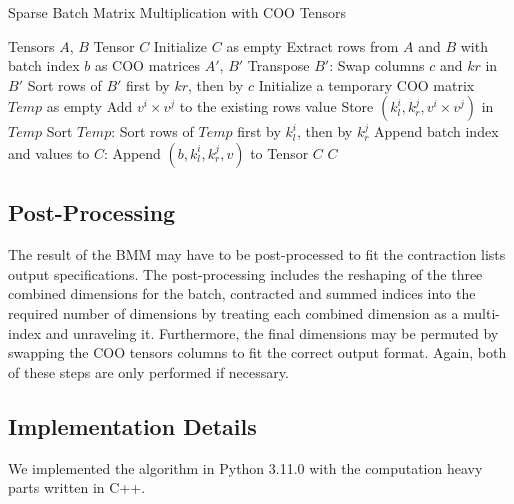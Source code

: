 \begin{algorithm}[H]
    \caption{Sparse Batch Matrix Multiplication with COO Tensors}
    \begin{algorithmic}[1]
        \REQUIRE Tensors $A$, $B$
        \ENSURE Tensor $C$
        \STATE Initialize $C$ as empty
            \STATE Extract rows from $A$ and $B$ with batch index $b$ as COO matrices $A'$, $B'$
            \STATE Transpose $B'$:
            \STATE Swap columns $c$ and $kr$ in $B'$
            \STATE Sort rows of $B'$ first by $kr$, then by $c$
            \STATE Initialize a temporary COO matrix $Temp$ as empty
                        \STATE Add $v^i \times v^j$ to the existing rows value
                    \ELSE
                        \STATE Store $(k_l^i, k_r^j, v^i \times v^j)$ in $Temp$
                    \ENDIF
                \ENDFOR
            \ENDFOR
            \STATE Sort $Temp$:
            \STATE Sort rows of $Temp$ first by $k_l^i$, then by $k_r^j$
            \STATE Append batch index and values to $C$:
                \STATE Append $(b, k_l^i, k_r^j, v)$ to Tensor $C$
            \ENDFOR
        \ENDFOR
        \RETURN $C$
    \end{algorithmic}
\end{algorithm}
    
\subsection{Post-Processing}
The result of the BMM may have to be post-processed to fit the contraction lists output
specifications. The post-processing includes the reshaping of the three combined dimensions for
the batch, contracted and summed indices into the required number of dimensions by treating
each combined dimension as a multi-index and unraveling it. Furthermore, the final dimensions
may be permuted by swapping the COO tensors columns to fit the correct output format. Again,
both of these steps are only performed if necessary.

\subsection{Implementation Details}
We implemented the algorithm in Python 3.11.0 with the computation heavy parts written in C++.

